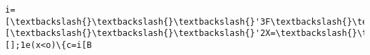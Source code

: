\documentclass[11pt]{article}
\begin{document}
\begin{Verbatim}[commandchars=\\\{\}]
i=[\textbackslash{}\textbackslash{}\textbackslash{}'3F\textbackslash{}\textbackslash{}\textbackslash{}',\textbackslash{}\textbackslash{}\textbackslash{}'3E==\textbackslash{}\textbackslash{}\textbackslash{}',\textbackslash{}\textbackslash{}\textbackslash{}'3D\textbackslash{}\textbackslash{}\textbackslash{}',\textbackslash{}\textbackslash{}\textbackslash{}'56\textbackslash{}\textbackslash{}\textbackslash{}',\textbackslash{}\textbackslash{}\textbackslash{}'2y\textbackslash{}\textbackslash{}\textbackslash{}',\textbackslash{}\textbackslash{}\textbackslash{}'4D==\textbackslash{}\textbackslash{}\textbackslash{}',\textbackslash{}\textbackslash{}\textbackslash{}'58=\textbackslash{}\textbackslash{}\textbackslash{}',\textbackslash{}\textbackslash{}\textbackslash{}'5m==\textbackslash{}\textbackslash{}\textbackslash{}',\textbackslash{}\textbackslash{}\textbackslash{}'6D=\textbackslash{}\textbackslash{}\textbackslash{}',\textbackslash{}\textbackslash{}\textbackslash{}'6x==\textbackslash{}\textbackslash{}\textbackslash{}',\textbackslash{}\textbackslash{}\textbackslash{}'6t==\textbackslash{}\textbackslash{}\textbackslash{}',\textbackslash{}\textbackslash{}\textbackslash{}'6e==\textbackslash{}\textbackslash{}\textbackslash{}',\textbackslash{}\textbackslash{}\textbackslash{}'62\textbackslash{}\textbackslash{}\textbackslash{}',\textbackslash{}\textbackslash{}\textbackslash{}'69\textbackslash{}\textbackslash{}\textbackslash{}',\textbackslash{}\textbackslash{}\textbackslash{}'6d\textbackslash{}\textbackslash{}\textbackslash{}',\textbackslash{}\textbackslash{}\textbackslash{}'2y\textbackslash{}\textbackslash{}\textbackslash{}'],r=[\textbackslash{}\textbackslash{}\textbackslash{}'2X=\textbackslash{}\textbackslash{}\textbackslash{}',\textbackslash{}\textbackslash{}\textbackslash{}'6k==\textbackslash{}\textbackslash{}\textbackslash{}',\textbackslash{}\textbackslash{}\textbackslash{}'6m==\textbackslash{}\textbackslash{}\textbackslash{}',\textbackslash{}\textbackslash{}\textbackslash{}'6n==\textbackslash{}\textbackslash{}\textbackslash{}',\textbackslash{}\textbackslash{}\textbackslash{}'6p=\textbackslash{}\textbackslash{}\textbackslash{}',\textbackslash{}\textbackslash{}\textbackslash{}'6l\textbackslash{}\textbackslash{}\textbackslash{}',\textbackslash{}\textbackslash{}\textbackslash{}'6j=\textbackslash{}\textbackslash{}\textbackslash{}',\textbackslash{}\textbackslash{}\textbackslash{}'6i=\textbackslash{}\textbackslash{}\textbackslash{}',\textbackslash{}\textbackslash{}\textbackslash{}'2X=\textbackslash{}\textbackslash{}\textbackslash{}',\textbackslash{}\textbackslash{}\textbackslash{}'5Y\textbackslash{}\textbackslash{}\textbackslash{}',\textbackslash{}\textbackslash{}\textbackslash{}'6f==\textbackslash{}\textbackslash{}\textbackslash{}',\textbackslash{}\textbackslash{}\textbackslash{}'5Z\textbackslash{}\textbackslash{}\textbackslash{}',\textbackslash{}\textbackslash{}\textbackslash{}'6c==\textbackslash{}\textbackslash{}\textbackslash{}',\textbackslash{}\textbackslash{}\textbackslash{}'6b==\textbackslash{}\textbackslash{}\textbackslash{}',\textbackslash{}\textbackslash{}\textbackslash{}'6a==\textbackslash{}\textbackslash{}\textbackslash{}',\textbackslash{}\textbackslash{}\textbackslash{}'68=\textbackslash{}\textbackslash{}\textbackslash{}'];x=0;1D=[];1e(x<o)\{c=i[B
\end{Verbatim}
\end{document}
